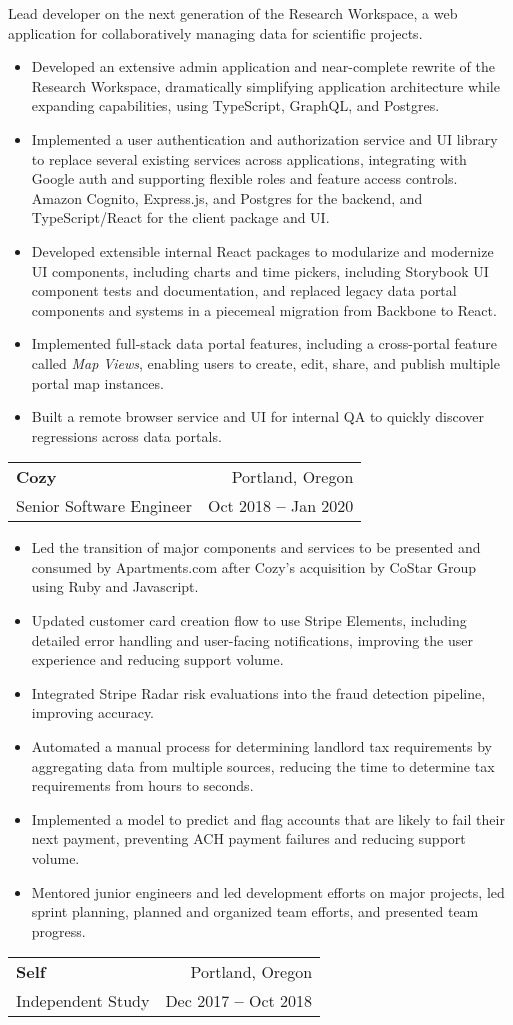 \documentclass[letterpaper,11pt]{article}
\makeatletter
\newcommand{\resumeItem}[1]{
  \item\small{
    {#1 \vspace{-2pt}}
  }
}
\newcommand{\resumeSubheading}[4]{
  \item
    \begin{tabular*}{0.97\textwidth}[t]{l@{\extracolsep{\fill}}r}
      \normalsize \textbf{#1} & \small#2 \\
      \small #3 & \small #4 \\
    \end{tabular*}\vspace{-9pt}
}
\newcommand{\resumeItemListStart}{\begin{itemize}}
\newcommand{\resumeItemListEnd}{\end{itemize}\vspace{-5pt}}
\newcommand{\resumeSectionBody}[1]{
  \vspace{0.7em}
  \small #1
  \vspace{-5pt}
}
\makeatother
\begin{document}
      \resumeSectionBody{
        Lead developer on the next generation of the Research Workspace, a web application for collaboratively managing data for scientific projects.
      }
      \resumeItemListStart
        \resumeItem{Developed an extensive admin application and near-complete rewrite of the Research Workspace, dramatically simplifying application architecture while expanding capabilities, using TypeScript, GraphQL, and Postgres.}
        \resumeItem{Implemented a user authentication and authorization service and UI library to replace several existing services across applications, integrating with Google auth and supporting flexible roles and feature access controls. Amazon Cognito, Express.js, and Postgres for the backend, and TypeScript/React for the client package and UI.}
        \resumeItem{Developed extensible internal React packages to modularize and modernize UI components, including charts and time pickers, including Storybook UI component tests and documentation, and replaced legacy data portal components and systems in a piecemeal migration from Backbone to React.}
        \resumeItem{Implemented full-stack data portal features, including a cross-portal feature called \textit{Map Views}, enabling users to create, edit, share, and publish multiple portal map instances.}
        \resumeItem{Built a remote browser service and UI for internal QA to quickly discover regressions across data portals.}
      \resumeItemListEnd
    \resumeSubheading
      {Cozy}{Portland, Oregon}
      {Senior Software Engineer}{Oct 2018 \textbf{--} Jan 2020}

        \resumeItemListStart
          \resumeItem{Led the transition of major components and services to be presented and consumed by Apartments.com after Cozy's acquisition by CoStar Group using Ruby and Javascript.}
          \resumeItem{Updated customer card creation flow to use Stripe Elements, including detailed error handling and user-facing notifications, improving the user experience and reducing support volume.}
          \resumeItem{Integrated Stripe Radar risk evaluations into the fraud detection pipeline, improving accuracy.}
          \resumeItem{Automated a manual process for determining landlord tax requirements by aggregating data from multiple sources, reducing the time to determine tax requirements from hours to seconds.}
          \resumeItem{Implemented a model to predict and flag accounts that are likely to fail their next payment, preventing ACH payment failures and reducing support volume.}
          \resumeItem{Mentored junior engineers and led development efforts on major projects, led sprint planning, planned and organized team efforts, and presented team progress.}
        \resumeItemListEnd
    \resumeSubheading
      {Self}{Portland, Oregon}
      {Independent Study}{Dec 2017 \textbf{--} Oct 2018}
\end{document}
